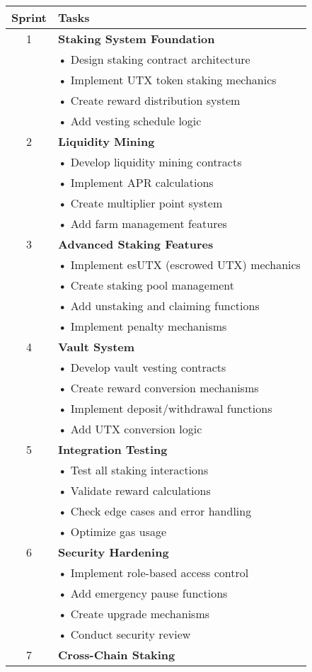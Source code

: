 \documentclass{article}
\begin{document}
\begin{longtable}{|c|p{}|}
\hline
\textbf{Sprint} & \textbf{Tasks} \\
\hline
1 & \textbf{Staking System Foundation}\\
& • Design staking contract architecture\\
& • Implement UTX token staking mechanics\\
& • Create reward distribution system\\
& • Add vesting schedule logic\\
\hline
2 & \textbf{Liquidity Mining}\\
& • Develop liquidity mining contracts\\
& • Implement APR calculations\\
& • Create multiplier point system\\
& • Add farm management features\\
\hline
3 & \textbf{Advanced Staking Features}\\
& • Implement esUTX (escrowed UTX) mechanics\\
& • Create staking pool management\\
& • Add unstaking and claiming functions\\
& • Implement penalty mechanisms\\
\hline
4 & \textbf{Vault System}\\
& • Develop vault vesting contracts\\
& • Create reward conversion mechanisms\\
& • Implement deposit/withdrawal functions\\
& • Add UTX conversion logic\\
\hline
5 & \textbf{Integration Testing}\\
& • Test all staking interactions\\
& • Validate reward calculations\\
& • Check edge cases and error handling\\
& • Optimize gas usage\\
\hline
6 & \textbf{Security Hardening}\\
& • Implement role-based access control\\
& • Add emergency pause functions\\
& • Create upgrade mechanisms\\
& • Conduct security review\\
\hline
7 & \textbf{Cross-Chain Staking}\\

\end{longtable}
\end{document}
